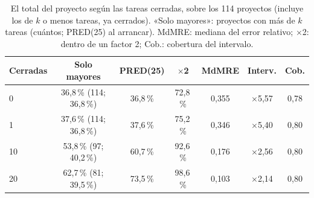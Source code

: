 \begin{table}[t]
\centering
\caption{El total del proyecto según las tareas cerradas, sobre los 114 proyectos (incluye los de $k$ o menos tareas, ya cerrados). «Solo mayores»: proyectos con más de $k$ tareas (cuántos; PRED(25) al arrancar). MdMRE: mediana del error relativo; $\times$2: dentro de un factor 2; Cob.: cobertura del intervalo.}
\label{tab:anclaje}
\footnotesize
\setlength{\tabcolsep}{2pt}
\begin{tabular}{lcccccc}
\toprule
Cerradas & Solo mayores & PRED(25) & $\times$2 & MdMRE & Interv. & Cob. \\
\midrule
0 & 36{,}8\,\% (114; 36{,}8\,\%) & 36{,}8\,\% & 72{,}8\,\% & 0{,}355 & $\times$5{,}57 & 0{,}78 \\
1 & 37{,}6\,\% (114; 36{,}8\,\%) & 37{,}6\,\% & 75{,}2\,\% & 0{,}346 & $\times$5{,}40 & 0{,}80 \\
10 & 53{,}8\,\% (97; 40{,}2\,\%) & 60{,}7\,\% & 92{,}6\,\% & 0{,}176 & $\times$2{,}56 & 0{,}80 \\
20 & 62{,}7\,\% (81; 39{,}5\,\%) & 73{,}5\,\% & 98{,}6\,\% & 0{,}103 & $\times$2{,}14 & 0{,}80 \\
\bottomrule
\end{tabular}
\end{table}
